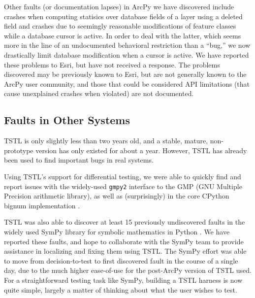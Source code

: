 Other faults (or documentation lapses) in ArcPy we have discovered include crashes when computing
statisics over database fields of a layer using a deleted field and
crashes due to seemingly reasonable modifications of feature classes
while a database cursor is active.  In order to deal with the latter,
which seems more in the line of an undocumented behavioral restriction
than a ``bug,'' we now drastically limit database modification when a
cursor is active.  We have reported these problems to Esri, but have
not received a response.  The problems discovered may be previously
known to Esri, but are not generally known to the ArcPy user
community, and those that could be considered API limitations (that
cause unexplained crashes when violated) are not documented.

\subsection{Faults in Other Systems}

TSTL  is only slightly less than two years old, and a stable, mature,
non-prototype version has only existed for about a year.   However,
TSTL has already been used to find important bugs in real systems.

Using TSTL's support for differential testing, we were able to 
quickly find 
and report issues with the widely-used {\tt gmpy2} interface to the GMP (GNU 
Multiple Precision \cite{gmp} arithmetic library), as well as 
(surprisingly) in the core CPython bignum implementation
\cite{gmpy2bugs,cpythonbug}. 


TSTL was also able to discover at least 15
previously undiscovered faults in the widely used SymPy library for
symbolic mathematics in Python \cite{sympy}.  We have reported these
faults, and hope to collaborate with the SymPy team to provide
assistance in localizing and fixing them using TSTL.  The SymPy
effort was able to move from
decision-to-test to first discovered fault in the course of a single
day, due to the much higher ease-of-use for the post-ArcPy version of
TSTL used.  For a straightforward testing task like SymPy, building a
TSTL harness is now quite simple, largely a matter of thinking about
what the user wishes to test.

